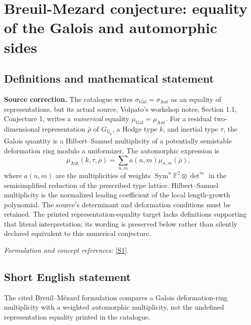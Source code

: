 \documentclass[11pt,a4paper]{article}
\newcommand{\Q}{\mathbb{Q}}
\newcommand{\F}{\mathbb{F}}
\newcommand{\sref}[2]{\hyperlink{source:#1:#2}{[S#2]}}
\newif\ifshowcatalogue
\newcommand{\cataloguescope}[1]{\ifshowcatalogue
 \paragraph{Exact scope in the supplied catalogue.}
 \begin{quote}\small #1\end{quote}\fi}
\numberwithin{equation}{section}
\begin{document}
\setcounter{section}{227}
\clearpage
\section{\texorpdfstring{Breuil-Mezard conjecture: equality of the Galois and automorphic sides}{Breuil-Mezard conjecture: equality of the Galois and automorphic sides}}\label{228}
\subsection{Definitions and mathematical statement}
\textbf{Source correction.} The catalogue writes $\sigma_{\mathrm{Gal}}=\sigma_{\mathrm{Aut}}$ as an equality of representations, but its actual source, Volpato's workshop notes, Section 1.1, Conjecture 1, writes a \emph{numerical} equality $\mu_{\mathrm{Gal}}=\mu_{\mathrm{Aut}}$. For a residual two-dimensional representation $\bar\rho$ of $G_{\Q_p}$, a Hodge type $k$, and inertial type $\tau$, the Galois quantity is a Hilbert--Samuel multiplicity of a potentially semistable deformation ring modulo a uniformizer. The automorphic expression is
\[
 \mu_{\mathrm{Aut}}(k,\tau,\bar\rho)=\sum_{n,m}a(n,m)\mu_{n,m}(\bar\rho),
\]
where $a(n,m)$ are the multiplicities of weights
$\operatorname{Sym}^n\F^2\otimes\det^m$ in the semisimplified reduction of the prescribed type lattice. Hilbert--Samuel multiplicity is the normalized leading coefficient of the local length-growth polynomial. The source's determinant and deformation conditions must be retained. The printed representation-equality target lacks definitions supporting that literal interpretation; its wording is preserved below rather than silently declared equivalent to this numerical conjecture.
\par\smallskip\textit{Formulation and concept references:} \sref{228}{1}.
\cataloguescope{Conjecture (Breuil-Mezard): the equality sigma\_Gal = sigma\_Aut holds, where sigma\_Gal and sigma\_Aut are the Galois and automorphic (locally algebraic) representations attached to a mod p Galois representation.}
\subsection{Short English statement}
The cited Breuil–Mézard formulation compares a Galois deformation-ring multiplicity with a weighted automorphic multiplicity, not the undefined representation equality printed in the catalogue.
\end{document}
